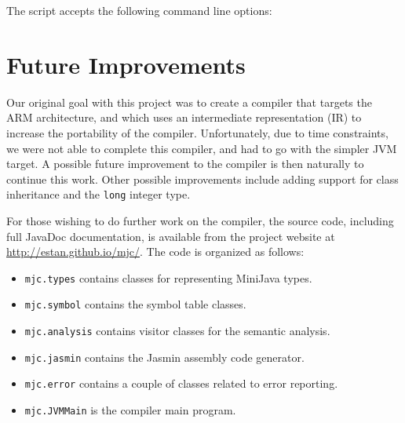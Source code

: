 \documentclass[a4paper,11pt]{article}
\begin{document}
The script accepts the following command line options:

\begin{alltt}

\end{alltt}
\section{Future Improvements}

\label{sec:improvements}

Our original goal with this project was to create a compiler that targets the
ARM architecture, and which uses an intermediate representation (IR) to increase the
portability of the compiler. Unfortunately, due to time constraints, we were not able
to complete this compiler, and had to go with the simpler JVM target. A possible
future improvement to the compiler is then naturally to continue this work. Other
possible improvements include adding support for class inheritance and the
\texttt{long} integer type.

For those wishing to do further work on the compiler, the source code, including full
JavaDoc documentation, is available from
the project website at \url{http://estan.github.io/mjc/}. The code is organized as
follows:

\begin{itemize}
    \item \texttt{mjc.types} contains classes for representing MiniJava types.
    \item \texttt{mjc.symbol} contains the symbol table classes.
    \item \texttt{mjc.analysis} contains visitor classes for the semantic analysis.
    \item \texttt{mjc.jasmin} contains the Jasmin assembly code generator.
    \item \texttt{mjc.error} contains a couple of classes related to error reporting.
    \item \texttt{mjc.JVMMain} is the compiler main program.
\end{itemize}

\printbibliography[heading=bibintoc]
\end{document}
